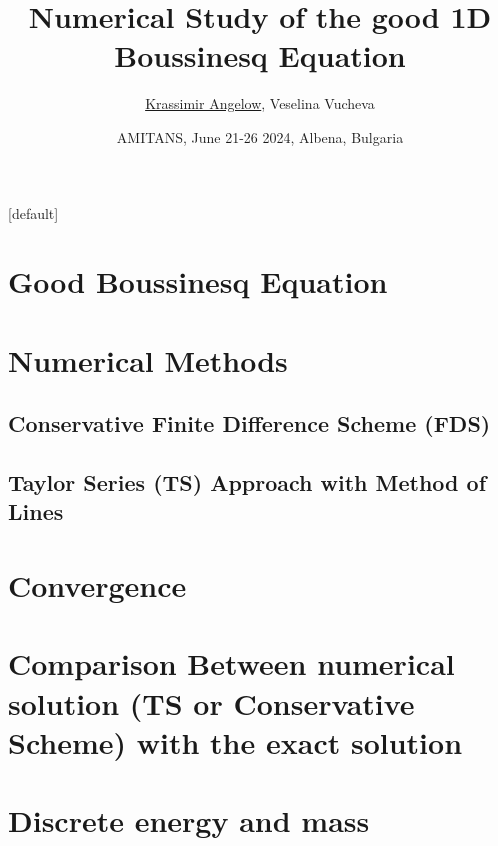 \documentclass{beamer}
\begin{document}
\title{Numerical Study of the good 1D Boussinesq Equation}

\author[angelow@math.bas.bg]{{\underline{Krassimir Angelow}}, Veselina Vucheva}
\date[2021]{AMITANS, June 21-26  2024,  Albena, Bulgaria}


\begin{frame}
 \titlepage

\end{frame}

\begin{frame}
\tableofcontents 
{}[default]
\section{Good Boussinesq Equation}
\section{Numerical Methods}
\subsection{Conservative Finite Difference Scheme (FDS) }
\subsection{Taylor Series (TS) Approach with Method of Lines }


\section{Convergence}

\section{Comparison Between numerical solution (TS or Conservative Scheme) with the exact solution}

\section{Discrete energy and mass}

\end{frame}
\end{document}
